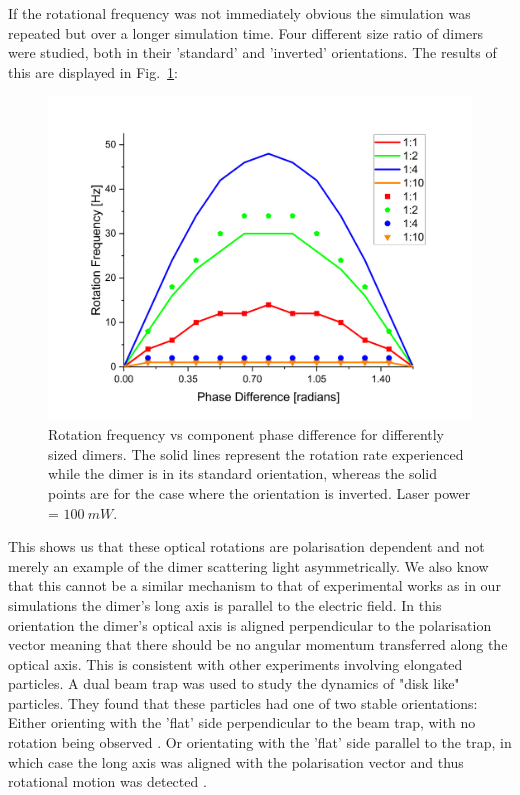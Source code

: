 If the rotational frequency was not immediately obvious the simulation was
repeated but over a longer simulation time. Four different size ratio of 
dimers were studied, both in their 'standard' and 'inverted' orientations. 
The results of this are displayed in Fig.~\ref{fig:rotation_vs_pol}:
\begin{figure}[h!]
	\centering
	\includegraphics[width=\linewidth]{rotation_vs_pol.png}
	\caption{Rotation frequency vs component phase difference for 
		differently sized dimers. The solid lines represent the 
		rotation rate experienced while the dimer is in its standard 
		orientation, whereas the solid points are for the case 
		where the orientation is inverted. Laser power = $100\ mW$.}
	\label{fig:rotation_vs_pol}
\end{figure}

This shows us that these optical rotations are polarisation 
dependent and not merely an example of the dimer scattering 
light asymmetrically. We also know that this cannot be a 
similar mechanism to that of experimental works \cite{Ahn2018, 
Reimann2018} as in our simulations the dimer's long axis
is parallel to the electric field. In this orientation 
the dimer's optical axis is aligned perpendicular to the
polarisation vector meaning that there should be no angular
momentum transferred along the optical axis. This is consistent 
with other experiments involving elongated particles. A dual
beam trap was used to study the dynamics of "disk like" particles. 
They found that these particles had one of two stable
orientations: Either orienting with the 'flat' side perpendicular
to the beam trap, with no rotation being observed \cite{Brzobohaty2015}. 
Or orientating with the 'flat' side parallel to the trap, in which 
case the long axis was aligned with the polarisation vector and 
thus rotational motion was detected \cite{Brzobohaty2015}.

